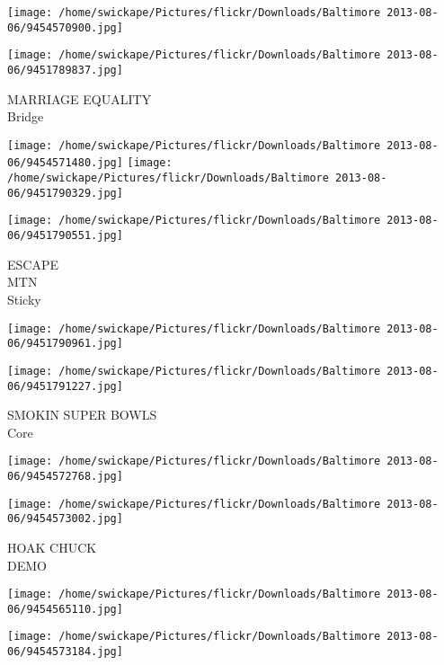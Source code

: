 \documentclass[10pt,letterpaper]{article}
\begin{document}
\texttt{[image: /home/swickape/Pictures/flickr/Downloads/Baltimore 2013-08-06/9454570900.jpg]}

\vspace{0.25in}
\texttt{[image: /home/swickape/Pictures/flickr/Downloads/Baltimore 2013-08-06/9451789837.jpg]}

MARRIAGE EQUALITY\\
Bridge\\
\pagebreak

\texttt{[image: /home/swickape/Pictures/flickr/Downloads/Baltimore 2013-08-06/9454571480.jpg]}
\texttt{[image: /home/swickape/Pictures/flickr/Downloads/Baltimore 2013-08-06/9451790329.jpg]}

\vspace{0.25in}
\texttt{[image: /home/swickape/Pictures/flickr/Downloads/Baltimore 2013-08-06/9451790551.jpg]}

ESCAPE\\
MTN\\
Sticky\\
\pagebreak

\texttt{[image: /home/swickape/Pictures/flickr/Downloads/Baltimore 2013-08-06/9451790961.jpg]}

\vspace{0.25in}
\texttt{[image: /home/swickape/Pictures/flickr/Downloads/Baltimore 2013-08-06/9451791227.jpg]}

SMOKIN SUPER BOWLS\\
Core\\
\pagebreak

\texttt{[image: /home/swickape/Pictures/flickr/Downloads/Baltimore 2013-08-06/9454572768.jpg]}

\vspace{0.25in}
\texttt{[image: /home/swickape/Pictures/flickr/Downloads/Baltimore 2013-08-06/9454573002.jpg]}

HOAK CHUCK\\
DEMO\\
\pagebreak

\texttt{[image: /home/swickape/Pictures/flickr/Downloads/Baltimore 2013-08-06/9454565110.jpg]}

\vspace{0.25in}
\texttt{[image: /home/swickape/Pictures/flickr/Downloads/Baltimore 2013-08-06/9454573184.jpg]}
\end{document}
